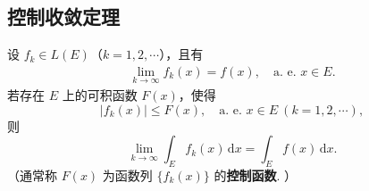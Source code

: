 \documentclass[../../main.tex]{subfiles}
\begin{document}
\subsection{控制收敛定理}

\begin{theorem}[控制收敛定理]\label{theorem:控制收敛定理}
设 $f_k \in L(E)$（$k = 1, 2, \cdots$），且有
\begin{align}\label{eq:100.101}
\lim_{k \to \infty} f_k(x) = f(x), \quad \text{a. e. } x \in E.
\end{align}
若存在 $E$ 上的可积函数 $F(x)$，使得
\[
|f_k(x)| \leqslant F(x), \quad \text{a. e. } x \in E \ (k = 1, 2, \cdots),
\]
则
\[
\lim_{k \to \infty} \int_E f_k(x) \, \mathrm{d}x = \int_E f(x) \, \mathrm{d}x. 
\]
（通常称 $F(x)$ 为函数列 $\{ f_k(x) \}$ 的\textbf{控制函数}. ）
\end{theorem}
\end{document}
